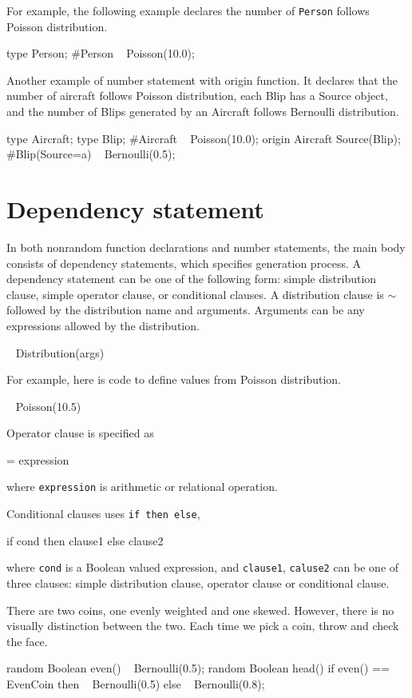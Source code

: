 \documentclass[12pt]{article}
\begin{document}
For example, the following example declares the number of \texttt{Person} follows Poisson distribution. 
\begin{blogcode}
type Person;
#Person ~ Poisson(10.0);
\end{blogcode}

Another example of number statement with origin function. It declares that the number of aircraft follows Poisson distribution, each Blip has a Source object, and the number of Blips generated by an Aircraft follows Bernoulli distribution.
\begin{blogcode}
type Aircraft;
type Blip;
#Aircraft ~ Poisson(10.0); 
origin Aircraft Source(Blip);
#Blip(Source=a) ~ Bernoulli(0.5);
\end{blogcode}

\section{Dependency statement}
In both nonrandom function declarations and number statements, the main body consists of dependency statements, which specifies generation process. 
A dependency statement can be one of the following form: simple distribution clause, simple operator clause, or conditional clauses.
A distribution clause is $\sim$ followed by the distribution name and arguments. Arguments can be any expressions allowed by the distribution.  
\begin{blogcode}
~ Distribution(args)
\end{blogcode} 
For example, here is code to define values from Poisson distribution.
\begin{blogcode}
~ Poisson(10.5)
\end{blogcode}

Operator clause is specified as
\begin{blogcode}
= expression
\end{blogcode}
where \texttt{expression} is arithmetic or relational operation. 

Conditional clauses uses \texttt{if then else}, 
\begin{blogcode}
if cond then clause1
else clause2
\end{blogcode}
where \texttt{cond} is a Boolean valued expression, and \texttt{clause1}, \texttt{caluse2} can be one of three clauses: simple distribution clause, operator clause or conditional clause. 

\begin{example}
There are two coins, one evenly weighted and one skewed. However, there is no visually distinction between the two. Each time we pick a coin, throw and check the face.
\begin{blogcode}
random Boolean even() 
  ~ Bernoulli(0.5);
random Boolean head() 
  if even() == EvenCoin then
    ~ Bernoulli(0.5)
  else
    ~ Bernoulli(0.8);
\end{blogcode}
\end{example}
\end{document}
